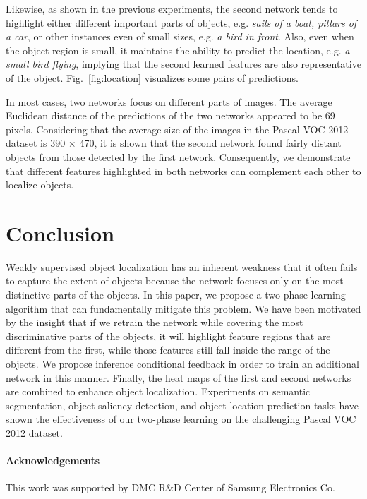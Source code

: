\documentclass[10pt,twocolumn,letterpaper]{article}
\newcommand{\figref}[1]{Fig.~\ref{#1}}
\begin{document}
Likewise, as shown in the previous experiments, the second network tends to highlight either different important parts of objects, e.g. \textit{sails of a boat, pillars of a car}, or other instances even of small sizes, e.g. \textit{a bird in front}. Also, even when the object region is small, it maintains the ability to predict the location, e.g. \textit{a small bird flying}, implying that the second learned features are also representative of the object. \figref{fig:location} visualizes some pairs of predictions.

In most cases, two networks focus on different parts of images. The average Euclidean distance of the predictions of the two networks appeared to be 69 pixels. Considering that the average size of the images in the Pascal VOC 2012 dataset is 390 $\times$ 470, it is shown that the second network found fairly distant objects from those detected by the first network. Consequently, we demonstrate that different features highlighted in both networks can complement each other to localize objects.




\section{Conclusion}
Weakly supervised object localization has an inherent weakness that it often fails to capture the extent of objects because the network focuses only on the most distinctive parts of the objects. In this paper, we propose a two-phase learning algorithm that can fundamentally mitigate this problem. We have been motivated by the insight that if we retrain the network while covering the most discriminative parts of the objects, it will highlight feature regions that are different from the first, while those features still fall inside the range of the objects. We propose inference conditional feedback in order to train an additional network in this manner. Finally, the heat maps of the first and second networks are combined to enhance object localization. Experiments on semantic segmentation, object saliency detection, and object location prediction tasks have shown the effectiveness of our two-phase learning on the challenging Pascal VOC 2012 dataset.

\paragraph{Acknowledgements}
This work was supported by DMC R\&D Center of Samsung Electronics Co.





\clearpage
\clearpage{\small


}
\end{document}
